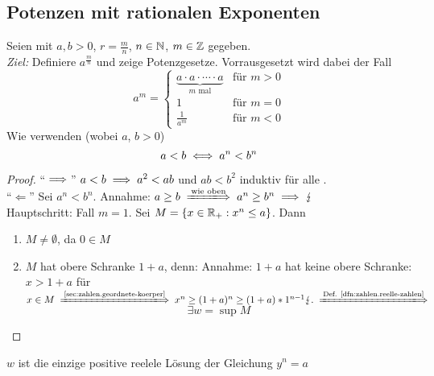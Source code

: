 \documentclass[12pt]{scrreprt}
\begin{document}
\subsection*{Potenzen mit rationalen Exponenten}
Seien  mit $a, b > 0$, $r=\frac{m}{n}$, $n\in\mathbb{N}$, $m\in\mathbb{Z}$ gegeben.\\
\emph{Ziel:} Definiere $a^\frac{m}{n}$ und zeige Potenzgesetze. Vorrausgesetzt wird dabei der Fall
\[a^m =
\begin{cases}
\underbrace{a \cdot a \cdot \dotsm \cdot a}_{m\text{ mal}} &\text{für }m>0\\
1 &\text{für }m=0\\
\frac{1}{a^m} &\text{für }m<0
\end{cases}\]
Wie verwenden (wobei $a$, $b > 0$)
\begin{equation} 
a<b \iff a^n <  b^n 
\label{eqn:zahlen.ordn-potenzen}
\end{equation}
\begin{proof}
"`$\implies$"' $a<b \implies a^2 < ab$ und $ab < b^2$ induktiv für alle .\\
"`$\Leftarrow$"' Sei $a^n < b^n$. Annahme: $a \ge b \folgtwegen{\text{wie oben}} a^n \ge b^n \folgt \blitz$\\
Hauptschritt: Fall $m=1$. Sei $M = \{ x \in \mathbb{R}_+ : x^n \le a \}$. Dann
\begin{enumerate}
\item $M \ne \emptyset$, da $0 \in M$
\item $M$ hat obere Schranke $1+a$, denn: Annahme: $1+a$ hat keine 
obere Schranke: $x>1+a$ für $x \in M \folgtnach{\ref{sec:zahlen.geordnete-koerper}} 
x^n \ge (1+a)^n\ge (1+a)*1^{n-1} \blitz. \folgtnach{Def. \ref{dfn:zahlen.reelle-zahlen}}$
\begin{equation}
\exists w = \sup M
\label{eqn:zahlen.potenzen-noname}
\end{equation}
\end{enumerate}
\end{proof}
\begin{lem}\label{lem:zahlen.wurzel}
$w$ ist die einzige positive reelele Lösung der Gleichung $y^n = a$
\end{lem}
\end{document}
